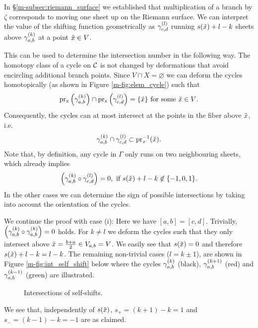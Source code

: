 \documentclass[main.tex]{subfiles}
\begin{document}
  In \S \ref{m-subsec:riemann_surface} we established that multiplication of a branch by $\zeta$ corresponds to moving
  one sheet up on the Riemann surface.
  We can interpret the value of the shifting function geometrically as
  $\gamma_{c,d}^{(l)}$ running $s(\tilde{x})+l-k$ sheets above $\gamma_{a,b}^{(k)}$ at a point $\tilde{x} \in V$.

 This can be used to determine the intersection number in the following way. The homotopy class of a cycle on $\mathcal{C}$ is not changed by deformations that avoid
 encircling additional branch points. Since $V \cap X = \varnothing$
 we can deform the cycles homotopically (as shown in Figure \ref{m-fig:elem_cycle})
 such that
 \begin{equation*}
   \operatorname{pr_x}\left(\gamma_{a,b}^{(k)}\right) \cap \operatorname{pr_x}\left(\gamma_{c,d}^{(l)}\right) = \{ \tilde{x} \}  \text{ for some $\tilde{x} \in V$.}
 \end{equation*}
 Consequently, the cycles can at most intersect at the
 points in the fiber above $\tilde{x}$, i.e.
 \begin{equation*}
  \gamma_{a,b}^{(k)} \cap \gamma_{c,d}^{(l)} \subset \text{pr}_x^{-1}(\tilde{x}).
 \end{equation*}
 Note that, by definition, any cycle in $\Gamma$ only runs on two neighbouring sheets, which already implies
 \begin{equation*}
   \left(\gamma_{a,b}^{(k)} \circ \gamma_{c,d}^{(l)}\right) = 0, \text{ if $s(\tilde{x})+l-k \not\in \{-1,0,1\}$.}
 \end{equation*}
  In the other cases we can determine the
  sign of possible intersections by taking into account the orientation of the cycles.

 We continue the proof with case (i):
 Here we have $[a,b] = [c,d]$. Trivially, $\left( \gamma_{a,b}^{(k)} \circ \gamma_{a,b}^{(k)} \right) = 0$ holds. For $k \ne l$ we deform the cycles such that they only intersect above
 $\tilde{x} = \frac{b+a}{2} \in  V_{a,b}= V$.
  We easily see that $s(\tilde{x}) = 0$ and therefore $s(\tilde{x}) + l - k = l - k$. The remaining non-trivial cases
 ($l = k \pm 1$), are shown in Figure \ref{m-fig:int_self_shift} below where
   the cycles $\gamma_{a,b}^{(k)}$ (black),
      $\gamma_{a,b}^{(k+1)}$ (red) and $\gamma_{a,b}^{(k-1)}$ (green) are illustrated. 
    \begin{figure}[H]
      \begin{center}
   \scalebox{0.8}{}
      \end{center}
    \caption{Intersections of self-shifts.}
    \label{fig:int_self_shift}
\end{figure}
  We see that, independently of $s(\tilde{x})$, $s_+ = (k+1)-k = 1$ and $s_- = (k-1)-k = -1$ are as claimed.
\end{document}
